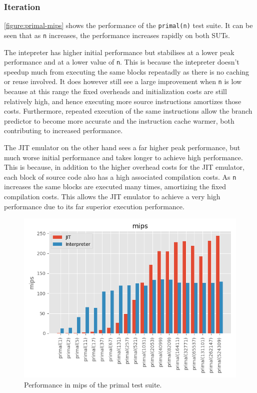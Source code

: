 \subsubsection{Iteration}

\autoref{figure:primal-mips} shows the performance of the \texttt{primal(n)} test suite. It can be seen that as \texttt{n} increases, the performance increases rapidly on both SUTs.

The intepreter has higher initial performance but stabilises at a lower peak performance and at a lower value of \texttt{n}. This is because the intepreter doesn't speedup much from executing the same blocks repeatadly as there is no caching or reuse involved. It does however still see a large improvement when \texttt{n} is low because at this range the fixed overheads and initialization costs are still relatively high, and hence executing more source instructions amortizes those costs. Furthermore, repeated execution of the same instructions allow the branch predictor to become more accurate and the instruction cache warmer, both contributing to increased performance.

The JIT emulator on the other hand sees a far higher peak performance, but much worse initial performance and takes longer to achieve high performance. This is because, in addition to the higher overhead costs for the JIT emulator, each block of source code also has a high associated compilation costs. As \texttt{n} increases the same blocks are executed many times, amortizing the fixed compilation costs. This allows the JIT emulator to achieve a very high performance due to its far superior execution performance.

\begin{figure}
    \centering
    \includegraphics{output/graphs/tests/primal/mips.png}
    \caption{Performance in mips of the primal test suite.}
    \label{figure:primal-mips}
\end{figure}

